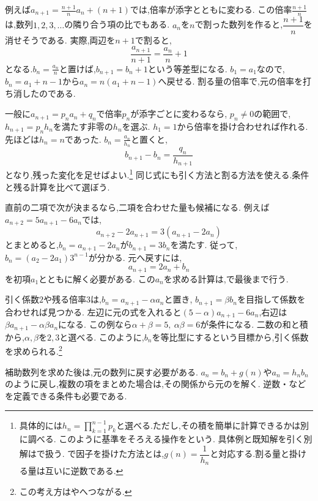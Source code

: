     例えば$a_{n+1}=\frac{n+1}{n}a_n+(n+1)$では,倍率が添字とともに変わる.
    この倍率$\frac{n+1}{n}$は,数列$1,2,3,\ldots$の隣り合う項の比でもある.
    $a_n$を$n$で割った数列を作ると,$\dfrac{n+1}{n}$を消せそうである.
    実際,両辺を$n+1$で割ると,
    \[
      \frac{a_{n+1}}{n+1}=\frac{a_n}{n}+1
    \]
    となる.$b_n=\frac{a_n}{n}$と置けば,$b_{n+1}=b_n+1$という等差型になる.
    $b_1=a_1$なので,$b_n=a_1+n-1$から$a_n=n(a_1+n-1)$へ戻せる.
    割る量の倍率で,元の倍率を打ち消したのである.

    一般に$a_{n+1}=p_na_n+q_n$で倍率$p_n$が添字ごとに変わるなら,
    $p_n\ne0$の範囲で,$h_{n+1}=p_nh_n$を満たす非零の$h_n$を選ぶ.
    $h_1=1$から倍率を掛け合わせれば作れる.先ほどは$h_n=n$であった.
    $b_n=\frac{a_n}{h_n}$と置くと,
    \[
      b_{n+1}-b_n=\frac{q_n}{h_{n+1}}
    \]
    となり,残った変化を足せばよい.\footnote{具体的には$h_n=\prod_{k=1}^{n-1}p_k$と選べる.ただし,その積を簡単に計算できるかは別に調べる.
    このように基準をそろえる操作を\textbf{}という.
    具体例と既知解を引く別解はで扱う.
    で因子を掛けた方法とは,$g(n)=\dfrac{1}{h_n}$と対応する.割る量と掛ける量は互いに逆数である.}
    同じ式にも引く方法と割る方法を使える.条件と残る計算を比べて選ぼう.

    直前の二項で次が決まるなら,二項を合わせた量も候補になる.
    例えば$a_{n+2}=5a_{n+1}-6a_n$では,
    \[
      a_{n+2}-2a_{n+1}=3(a_{n+1}-2a_n)
    \]
    とまとめると,$b_n=a_{n+1}-2a_n$が$b_{n+1}=3b_n$を満たす.
    従って,$b_n=(a_2-2a_1)3^{n-1}$が分かる.
    元へ戻すには,
    \[
      a_{n+1}=2a_n+b_n
    \]
    を初項$a_1$とともに解く必要がある.
    この$a_n$を求める計算は,で最後まで行う.

    引く係数$2$や残る倍率$3$は,$b_n=a_{n+1}-\alpha a_n$と置き,
    $b_{n+1}=\beta b_n$を目指して係数を合わせれば見つかる.
    左辺に元の式を入れると$(5-\alpha)a_{n+1}-6a_n$,右辺は$\beta a_{n+1}-\alpha\beta a_n$になる.
    この例なら$\alpha+\beta=5,\ \alpha\beta=6$が条件になる.
    二数の和と積から,$\alpha,\beta$を$2,3$と選べる.
    このように,$b_n$を等比型にするという目標から,引く係数を求められる.\footnote{この考え方はやへつながる.}

    補助数列を求めた後は,元の数列に戻す必要がある.
    $a_n=b_n+g(n)$や$a_n=h_nb_n$のように戻し,複数の項をまとめた場合は,その関係から元のを解く.
    逆数・などを定義できる条件も必要である.

